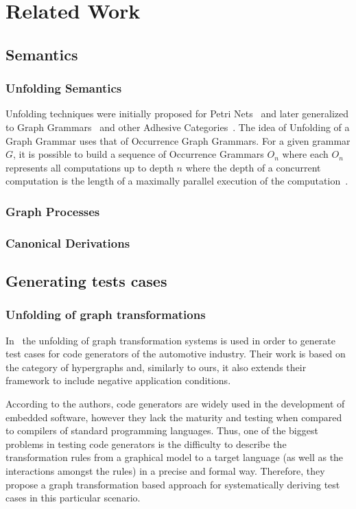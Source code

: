 \chapter{Related Work}\label{ch:related-work}

\section{Semantics}

\subsection{Unfolding Semantics}

  Unfolding techniques were initially proposed for Petri Nets~\cite{Nielsen1981} and later generalized to Graph Grammars~\cite{Ribeiro1996} and other Adhesive Categories~\cite{Baldan2009}.
  The idea of Unfolding of a Graph Grammar uses that of Occurrence Graph Grammars. For a given grammar $G$, it is possible to build a sequence
of Occurrence Grammars $O_n$ where each $O_n$ represents all computations up to depth $n$ where the depth of a concurrent computation is the length of a maximally parallel execution of the computation~\cite{Baldan2009}.

\subsection{Graph Processes}

\subsection{Canonical Derivations}

\section{Generating tests cases}

\subsection{Unfolding of graph transformations}

  In~\cite{Baldan2004} the unfolding of graph transformation systems is used in order to generate test cases for code generators of the automotive industry.
  Their work is based on the category of hypergraphs and, similarly to ours, it also extends their framework to include negative application conditions.

  According to the authors, code generators are widely used in the development of embedded software, however they lack the maturity and testing when compared to compilers of standard programming languages.
  Thus, one of the biggest problems in testing code generators is the difficulty to describe the transformation rules from a graphical model to a target language (as well as the interactions amongst the rules) in a precise and formal way.
  Therefore, they propose a graph transformation based approach for systematically deriving test cases in this particular scenario.

